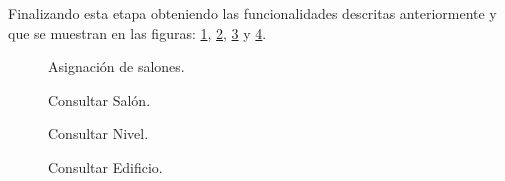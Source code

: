  Finalizando esta etapa obteniendo las funcionalidades descritas anteriormente y que se muestran en las figuras: \ref{S1}, \ref{S2}, \ref{S3} y \ref{S4}. \\
 
 \begin{figure}[h!]
 	\begin{center}
 		\caption{Asignación de salones.}
 		\label{S1}
 	\end{center}
 \end{figure}\begin{figure}[h!]
 \begin{center}
 	\caption{Consultar  Salón.}
 	\label{S2}
 \end{center}
\end{figure}\begin{figure}[h!]
\begin{center}
	\caption{Consultar Nivel.}
	\label{S3}
\end{center}
\end{figure}\begin{figure}[h!]
\begin{center}
	\caption{Consultar Edificio.}
	\label{S4}
\end{center}
\end{figure}
 
 